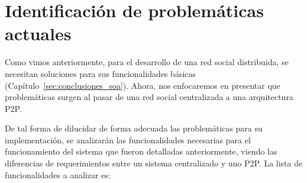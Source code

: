 

\section{Identificación de problemáticas actuales}
\label{sec:identificacion_problemas}

Como vimos anteriormente, para el desarrollo de una red social distribuida, se necesitan
soluciones para sus funcionalidades básicas (Capítulo~\ref{sec:conclusiones_soa}). Ahora,
nos enfocaremos en presentar que problemáticas surgen al pasar de una red
social centralizada a una arquitectura P2P.


De tal forma de dilucidar de forma adecuada las
problemáticas para su implementación, se analizarán las funcionalidades necesarias para el
funcionamiento del sistema que fueron detalladas anteriormente, viendo las
diferencias de requerimientos entre un sistema centralizado y uno P2P. La lista
de funcionalidades a analizar es:
